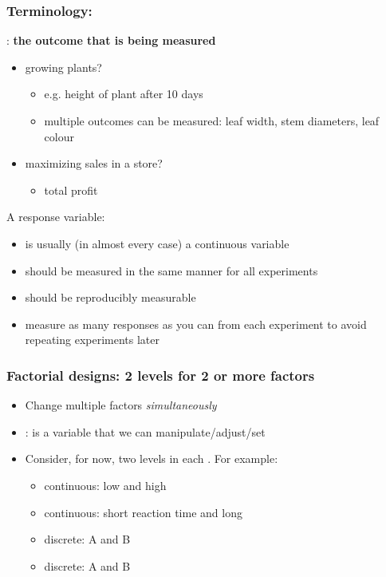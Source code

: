 \begin{frame}\frametitle{Terminology: {\color{purple}{Response}}}
	{\color{purple}{Response}}: \textbf{the outcome that is being measured}

	\vspace{12pt}
	\begin{itemize}
		\item	growing plants? 
			\begin{itemize}
				\item	e.g. height of plant after 10 days
				\item	multiple outcomes can be measured: leaf width, stem diameters, leaf colour
			\end{itemize}
		\item	maximizing sales in a store? 
			\begin{itemize}
				\item	total profit
			\end{itemize}
	\end{itemize}
	
	\vspace{12pt}
	A response variable:
	\begin{itemize}
		\item	is usually (in almost every case) a continuous variable
		\item	should be measured in the same manner for all experiments
		\item	should be reproducibly measurable
		\item	measure as many responses as you can from each experiment to avoid repeating experiments later
	\end{itemize}	
\end{frame}

\begin{frame}\frametitle{Factorial designs: 2 levels for 2 or more factors}
	\begin{itemize}
		\item	Change multiple factors \emph{simultaneously}
		\item	{\color{purple}{Factor}}: is a variable that we can manipulate/adjust/set
		\item	Consider, for now, two levels in each \textbf{{\color{myOrange}{factor}}}. For example:
		\begin{itemize}
			
			\item	continuous: low and high {\color{myOrange}{pH}}
			\item	continuous: short reaction time and long {\color{myOrange}{reaction time}}
			\item	discrete: {\color{myOrange}{catalyst}} A and B
			\item	discrete: {\color{myOrange}{mixing system}} A and B
		\end{itemize}
	\end{itemize}
\end{frame}


